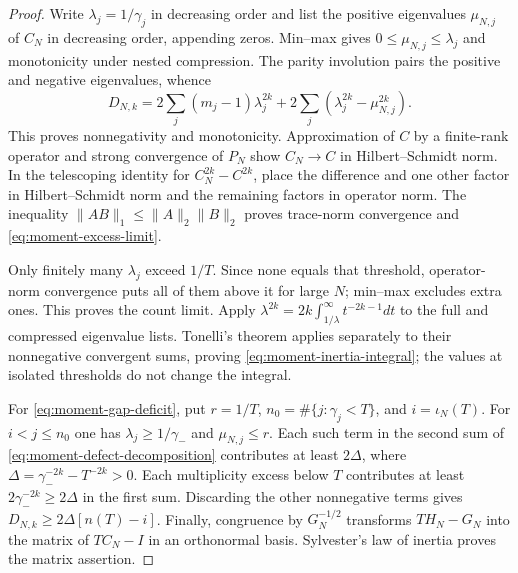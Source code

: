 \begin{proof}
Write $\lambda_j=1/\gamma_j$ in decreasing order and list the
positive eigenvalues $\mu_{N,j}$ of $C_N$ in decreasing order,
appending zeros. Min--max gives $0\leq\mu_{N,j}\leq\lambda_j$
and monotonicity under nested compression. The parity involution
pairs the positive and negative eigenvalues, whence
\begin{equation}\label{eq:moment-defect-decomposition}
 D_{N,k}=2\sum_j(m_j-1)\lambda_j^{2k}
              +2\sum_j(\lambda_j^{2k}-\mu_{N,j}^{2k}).
\end{equation}
This proves nonnegativity and monotonicity. Approximation of $C$
by a finite-rank operator and strong convergence of $P_N$ show
$C_N\to C$ in Hilbert--Schmidt norm. In the telescoping identity
for $C_N^{2k}-C^{2k}$, place the difference and one other factor
in Hilbert--Schmidt norm and the remaining factors in operator
norm. The inequality $\|AB\|_1\leq\|A\|_2\|B\|_2$ proves
trace-norm convergence and \eqref{eq:moment-excess-limit}.

Only finitely many $\lambda_j$ exceed $1/T$. Since none equals
that threshold, operator-norm convergence puts all of them above
it for large $N$; min--max excludes extra ones. This proves the
count limit. Apply
$\lambda^{2k}=2k\int_{1/\lambda}^\infty t^{-2k-1}dt$
to the full and compressed eigenvalue lists. Tonelli's theorem
applies separately to their nonnegative convergent sums, proving
\eqref{eq:moment-inertia-integral}; the values at isolated
thresholds do not change the integral.

For \eqref{eq:moment-gap-deficit}, put
$r=1/T$, $n_0=\#\{j:\gamma_j<T\}$, and $i=\iota_N(T)$.
For $i<j\leq n_0$ one has $\lambda_j\geq1/\gamma_-$ and
$\mu_{N,j}\leq r$. Each such term in the second sum of
\eqref{eq:moment-defect-decomposition} contributes at least
$2\Delta$, where $\Delta=\gamma_-^{-2k}-T^{-2k}>0$.
Each multiplicity excess below $T$ contributes at least
$2\gamma_-^{-2k}\geq2\Delta$ in the first sum. Discarding the
other nonnegative terms gives
$D_{N,k}\geq2\Delta[n(T)-i]$. Finally, congruence by
$G_N^{-1/2}$ transforms $TH_N-G_N$ into the matrix of
$TC_N-I$ in an orthonormal basis. Sylvester's law of inertia
proves the matrix assertion.
\end{proof}

